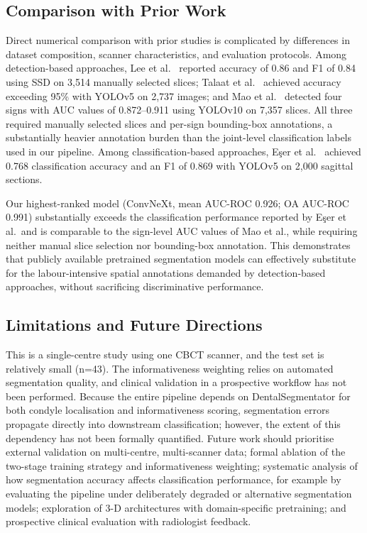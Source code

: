 \documentclass[review,12pt]{elsarticle}
\begin{document}
\subsection{Comparison with Prior Work}

Direct numerical comparison with prior studies is complicated by differences in dataset composition, scanner characteristics, and evaluation protocols. Among detection-based approaches, Lee et al.~\cite{lee2020automated} reported accuracy of 0.86 and F1 of 0.84 using SSD on 3{,}514 manually selected slices; Talaat et al.~\cite{talaat2023artificial} achieved accuracy exceeding 95\% with YOLOv5 on 2{,}737 images; and Mao et al.~\cite{Mao2025} detected four signs with AUC values of 0.872--0.911 using YOLOv10 on 7{,}357 slices. All three required manually selected slices and per-sign bounding-box annotations, a substantially heavier annotation burden than the joint-level classification labels used in our pipeline. Among classification-based approaches, E\c{s}er et al.~\cite{ecser2023classification} achieved 0.768 classification accuracy and an F1 of 0.869 with YOLOv5 on 2{,}000 sagittal sections.

Our highest-ranked model (ConvNeXt, mean AUC-ROC 0.926; OA AUC-ROC 0.991) substantially exceeds the classification performance reported by E\c{s}er et al.\ and is comparable to the sign-level AUC values of Mao et al., while requiring neither manual slice selection nor bounding-box annotation. This demonstrates that publicly available pretrained segmentation models can effectively substitute for the labour-intensive spatial annotations demanded by detection-based approaches, without sacrificing discriminative performance.

\subsection{Limitations and Future Directions}
This is a single-centre study using one CBCT scanner, and the test set is relatively small (n=43). The informativeness weighting relies on automated segmentation quality, and clinical validation in a prospective workflow has not been performed. Because the entire pipeline depends on DentalSegmentator for both condyle localisation and informativeness scoring, segmentation errors propagate directly into downstream classification; however, the extent of this dependency has not been formally quantified. Future work should prioritise external validation on multi-centre, multi-scanner data; formal ablation of the two-stage training strategy and informativeness weighting; systematic analysis of how segmentation accuracy affects classification performance, for example by evaluating the pipeline under deliberately degraded or alternative segmentation models; exploration of 3-D architectures with domain-specific pretraining; and prospective clinical evaluation with radiologist feedback.
\end{document}

